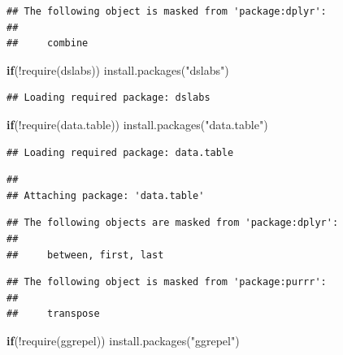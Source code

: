 \documentclass[
]{article}
\newenvironment{Shaded}{}{}
\newcommand{\ControlFlowTok}[1]{\textcolor[rgb]{0.00,0.44,0.13}{\textbf{#1}}}
\newcommand{\FunctionTok}[1]{\textcolor[rgb]{0.02,0.16,0.49}{#1}}
\newcommand{\NormalTok}[1]{#1}
\newcommand{\SpecialCharTok}[1]{\textcolor[rgb]{0.25,0.44,0.63}{#1}}
\newcommand{\StringTok}[1]{\textcolor[rgb]{0.25,0.44,0.63}{#1}}
\begin{document}
\begin{verbatim}
## The following object is masked from 'package:dplyr':
## 
##     combine
\end{verbatim}

\begin{Shaded}
\begin{Highlighting}[]
\ControlFlowTok{if}\NormalTok{(}\SpecialCharTok{!}\FunctionTok{require}\NormalTok{(dslabs)) }\FunctionTok{install.packages}\NormalTok{(}\StringTok{"dslabs"}\NormalTok{)}
\end{Highlighting}
\end{Shaded}

\begin{verbatim}
## Loading required package: dslabs
\end{verbatim}

\begin{Shaded}
\begin{Highlighting}[]
\ControlFlowTok{if}\NormalTok{(}\SpecialCharTok{!}\FunctionTok{require}\NormalTok{(data.table)) }\FunctionTok{install.packages}\NormalTok{(}\StringTok{"data.table"}\NormalTok{)}
\end{Highlighting}
\end{Shaded}

\begin{verbatim}
## Loading required package: data.table
\end{verbatim}

\begin{verbatim}
## 
## Attaching package: 'data.table'
\end{verbatim}

\begin{verbatim}
## The following objects are masked from 'package:dplyr':
## 
##     between, first, last
\end{verbatim}

\begin{verbatim}
## The following object is masked from 'package:purrr':
## 
##     transpose
\end{verbatim}

\begin{Shaded}
\begin{Highlighting}[]
\ControlFlowTok{if}\NormalTok{(}\SpecialCharTok{!}\FunctionTok{require}\NormalTok{(ggrepel)) }\FunctionTok{install.packages}\NormalTok{(}\StringTok{"ggrepel"}\NormalTok{)}
\end{Highlighting}
\end{Shaded}
\end{document}
